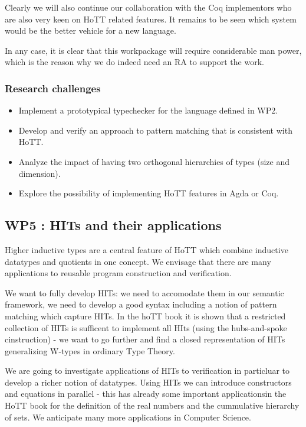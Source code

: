 \documentclass[twocolumn,a4paper,11pt]{article}
\begin{document}
Clearly we will also continue our collaboration with the Coq
implementors who are also very keen on HoTT related features. It
remains to be seen which system would be the better vehicle for a new
language.

In any case, it is clear that this workpackage will require
considerable man power, which is the reason why we do indeed need an
RA to support the work. 

\subsubsection*{Research challenges}

\begin{itemize}

\item Implement a prototypical typechecker for the language defined in
  WP2. 

\item Develop and verify an approach to pattern matching that is
  consistent with HoTT.

\item Analyze the impact of having two orthogonal hierarchies of types
  (size and dimension).

\item Explore the possibility of implementing HoTT features in Agda or
  Coq.
  
\end{itemize}

\subsection*{WP5 : HITs and their applications} 

Higher inductive types are a central feature of HoTT which combine 
inductive datatypes and quotients in one concept. We envisage that
there are many applications to reusable program construction and
verification. 

We want to fully develop HITs: we need to accomodate them in our
semantic framework, we need to develop a good syntax including a
notion of pattern matching which capture HITs. In the hoTT book it is
shown that a restricted collection of HITs is sufficent to implement
all HIts (using the hubs-and-spoke cinstruction) - we want to go
further and find a closed representation of HITs generalizing W-types
in ordinary Type Theory.

We are going to investigate applications of HITs to verification in
particluar to develop a richer notion of datatypes. Using HITs we can
introduce constructors and equations in parallel - this has already
some important applicationsin the HoTT book for the definition of the
real numbers and the cummulative hierarchy of sets. We anticipate many
more applications in Computer Science.
\end{document}
